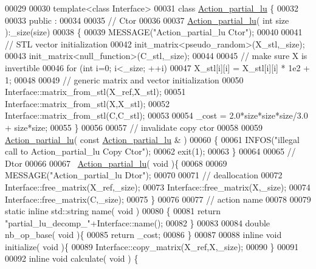 \begin{DoxyCode}
00029 
00030 \textcolor{keyword}{template}<\textcolor{keyword}{class} Interface>
00031 \textcolor{keyword}{class }\hyperlink{class_action__partial__lu}{Action\_partial\_lu} \{
00032 
00033 public :
00034 
00035   \textcolor{comment}{// Ctor}
00036 
00037   \hyperlink{class_action__partial__lu}{Action\_partial\_lu}( \textcolor{keywordtype}{int} size ):\_size(size)
00038   \{
00039     MESSAGE(\textcolor{stringliteral}{"Action\_partial\_lu Ctor"});
00040 
00041     \textcolor{comment}{// STL vector initialization}
00042     init\_matrix<pseudo\_random>(X\_stl,\_size);
00043     init\_matrix<null\_function>(C\_stl,\_size);
00044 
00045     \textcolor{comment}{// make sure X is invertible}
00046     \textcolor{keywordflow}{for} (\textcolor{keywordtype}{int} i=0; i<\_size; ++i)
00047       X\_stl[i][i] = X\_stl[i][i] * 1e2 + 1;
00048 
00049     \textcolor{comment}{// generic matrix and vector initialization}
00050     Interface::matrix\_from\_stl(X\_ref,X\_stl);
00051     Interface::matrix\_from\_stl(X,X\_stl);
00052     Interface::matrix\_from\_stl(C,C\_stl);
00053 
00054     \_cost = 2.0*size*size*size/3.0 + size*size;
00055   \}
00056 
00057   \textcolor{comment}{// invalidate copy ctor}
00058 
00059   \hyperlink{class_action__partial__lu}{Action\_partial\_lu}( \textcolor{keyword}{const}  \hyperlink{class_action__partial__lu}{Action\_partial\_lu} & )
00060   \{
00061     INFOS(\textcolor{stringliteral}{"illegal call to Action\_partial\_lu Copy Ctor"});
00062     exit(1);
00063   \}
00064 
00065   \textcolor{comment}{// Dtor}
00066 
00067   ~\hyperlink{class_action__partial__lu}{Action\_partial\_lu}( \textcolor{keywordtype}{void} )\{
00068 
00069     MESSAGE(\textcolor{stringliteral}{"Action\_partial\_lu Dtor"});
00070 
00071     \textcolor{comment}{// deallocation}
00072     Interface::free\_matrix(X\_ref,\_size);
00073     Interface::free\_matrix(X,\_size);
00074     Interface::free\_matrix(C,\_size);
00075   \}
00076 
00077   \textcolor{comment}{// action name}
00078 
00079   \textcolor{keyword}{static} \textcolor{keyword}{inline} std::string name( \textcolor{keywordtype}{void} )
00080   \{
00081     \textcolor{keywordflow}{return} \textcolor{stringliteral}{"partial\_lu\_decomp\_"}+Interface::name();
00082   \}
00083 
00084   \textcolor{keywordtype}{double} nb\_op\_base( \textcolor{keywordtype}{void} )\{
00085     \textcolor{keywordflow}{return} \_cost;
00086   \}
00087 
00088   \textcolor{keyword}{inline} \textcolor{keywordtype}{void} initialize( \textcolor{keywordtype}{void} )\{
00089     Interface::copy\_matrix(X\_ref,X,\_size);
00090   \}
00091 
00092   \textcolor{keyword}{inline} \textcolor{keywordtype}{void} calculate( \textcolor{keywordtype}{void} ) \{

\end{DoxyCode}
